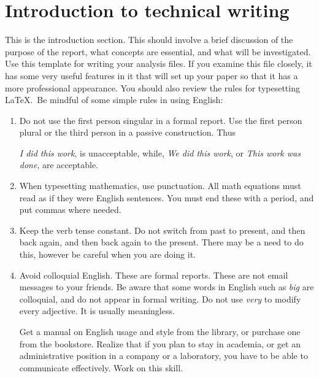\section{Introduction to technical writing}
This is the introduction section. This should involve a brief discussion
of the purpose of the report, what concepts are essential, and what
will be investigated. Use this template for writing your analysis
files. If you examine this file closely, it has some very useful
features in it that will set up your paper so that it has a more 
professional appearance.
You should also review the rules for typesetting \LaTeX.\ 
Be mindful of some simple rules in using English:
\begin{enumerate}
\item
Do not use the first person singular in a formal report. Use the first
person plural or the third person in a passive construction. Thus

\textit{I did this work}, is unacceptable, while,
\textit{We did this work}, or
\textit{This work was done}, are acceptable.

\item
When typesetting mathematics, use punctuation. All math equations must
read as if they were English sentences. You must end these with a period,
and put commas where needed.

\item
Keep the verb tense constant. Do not switch from past to present, and then
back again, and then back again to the present. There may be a need to
do this, however be careful when you are doing it.

\item
Avoid colloquial English.
These are formal reports. These are not email
messages to your friends. Be aware that some words in English such
as \textit{big} are colloquial, and do not appear in formal writing.
Do not use \textit{very} to modify every adjective. It is usually
meaningless.

Get a manual on English usage and style from the library, or purchase one
from the bookstore. Realize that if you plan to stay in academia, or get an
administrative position in a company or a laboratory, you have to be able
to communicate effectively. Work on this skill.
\end{enumerate}


